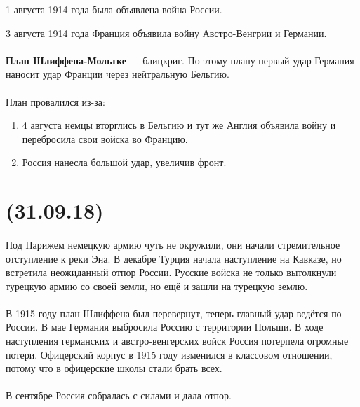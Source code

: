 \documentclass[dvipdfmx]{article}
\begin{document}
1 августа 1914 года была объявлена война России.

3 августа 1914 года Франция объявила войну Австро-Венгрии и Германии.

\paragraph{}
\textbf{План Шлиффена-Мольтке} --- блицкриг.
По этому плану первый удар Германия наносит удар Франции через нейтральную Бельгию.

\paragraph{}

План провалился из-за:
\begin{enumerate}
\item
  4 августа немцы вторглись в Бельгию и тут же Англия объявила войну и перебросила свои войска во Францию.
\item
  Россия нанесла большой удар, увеличив фронт.
\end{enumerate}

\newpage
\noindent\makebox[\linewidth]{\rule{\paperwidth}{0.4pt}}
\section{(31.09.18)}
\noindent\makebox[\linewidth]{\rule{\paperwidth}{0.4pt}}

\paragraph{}
Под Парижем немецкую армию чуть не окружили, они начали стремительное отступление к реки Эна.
В декабре Турция начала наступление на Кавказе, но встретила неожиданный отпор России. Русские войска не только
вытолкнули турецкую армию со своей земли, но ещё и зашли на турецкую землю.

\paragraph{}
В 1915 году план Шлиффена был перевернут, теперь главный удар ведётся по России. В мае Германия выбросила Россию с
территории Польши. В ходе наступления германских и австро-венгерских войск Россия потерпела огромные потери.
Офицерский корпус в 1915 году изменился в классовом отношении, потому что в офицерские школы стали брать всех.

\paragraph{}
В сентябре Россия собралась с силами и дала отпор.
\end{document}
